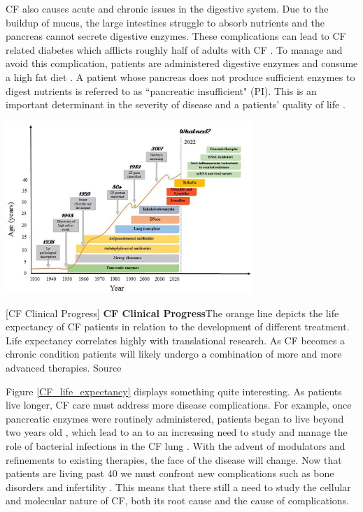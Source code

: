 CF also causes acute and chronic issues in the digestive system. Due to the buildup of mucus, the large intestines struggle to absorb nutrients and the pancreas cannot secrete digestive enzymes. These complications can lead to CF related diabetes which afflicts roughly half of adults with CF \cite{Kayani2018}. To manage and avoid this complication, patients are administered digestive enzymes and consume a high fat diet \cite{sullivan2017}. A patient whose pancreas does not produce sufficient enzymes to digest nutrients is referred to as ``pancreatic insufficient" (PI). This is an important determinant in the severity of disease and a patients' quality of life \cite{halloran2011,singh2017}. 

\begin{center}
\includegraphics[width=0.7\textwidth]{figures/CF_life_expectancy.png}
\end{center}
\begingroup
{}[CF Clinical Progress] {\textbf{CF Clinical Progress}}{The orange line depicts the life expectancy of CF patients in relation to the development of different treatment. Life expectancy correlates highly with translational research. As CF becomes a chronic condition patients will likely undergo a combination of more and more advanced therapies. Source \cite{garcia2022}} 
\label{CF_life_expectancy}
\endgroup

Figure \ref{CF_life_expectancy} displays something quite interesting. As patients live longer, CF care must address more disease complications. For example, once pancreatic enzymes were routinely administered, patients began to live beyond two years old \cite{roberts1957, levy2011}, which lead to an to an increasing need to study and manage the role of bacterial infections in the CF lung \cite{burns2001}. With the advent of modulators and refinements to existing therapies, the face of the disease will change. Now that patients are living past 40 we must confront new complications such as bone disorders and infertility \cite{stalvey2013, popli2007}. This means that there still a need to study the cellular and molecular nature of CF, both its root cause and the cause of complications. 


